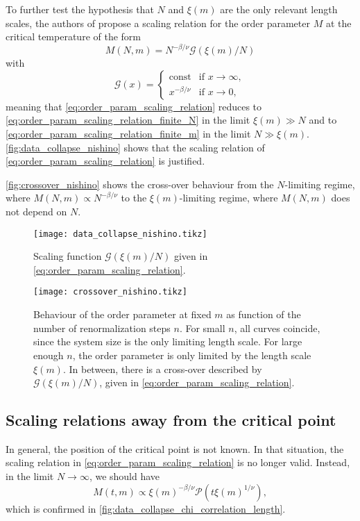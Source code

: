 To further test the hypothesis that $N$ and $\xi(m)$ are the only relevant length scales,
the authors of \cite{nishino1996numerical} propose a scaling relation for the order
parameter $M$ at the critical temperature of the form
\begin{equation}\label{eq:order_param_scaling_relation}
  M(N, m) = N^{-\beta/\nu} \mathcal{G}(\xi(m) / N)
\end{equation}
with
\begin{equation}
  \mathcal{G}(x) =
  \begin{cases}
    \text{const} & \text{if } x \to \infty, \\
    x^{-\beta/\nu} & \text{if } x \to 0,
  \end{cases}
\end{equation}
meaning that \autoref{eq:order_param_scaling_relation} reduces to
\autoref{eq:order_param_scaling_relation_finite_N} in the limit $\xi(m) \gg N$ and to
\autoref{eq:order_param_scaling_relation_finite_m} in the limit $N \gg \xi(m)$.
\autoref{fig:data_collapse_nishino} shows that the scaling relation of \autoref{eq:order_param_scaling_relation}
is justified.

\autoref{fig:crossover_nishino} shows the cross-over behaviour from the $N$-limiting regime, where
$M(N, m) \propto N^{-\beta/\nu}$ to the $\xi(m)$-limiting regime, where $M(N, m)$ does not depend on $N$.

\begin{figure}
  \texttt{[image: data\_collapse\_nishino.tikz]}
  \caption{Scaling function $\mathcal{G}(\xi(m)/N)$ given in
  \autoref{eq:order_param_scaling_relation}.}\label{fig:data_collapse_nishino}
\end{figure}

\begin{figure}
  \texttt{[image: crossover\_nishino.tikz]}
  \caption{Behaviour of the order parameter at fixed $m$ as function of
  the number of renormalization steps $n$. For small $n$, all curves coincide, since the system size is the only
  limiting length scale. For large enough $n$, the order parameter is only limited by the length scale
  $\xi(m)$. In between, there is a cross-over described by $\mathcal{G}(\xi(m)/N)$, given in
  \autoref{eq:order_param_scaling_relation}.}\label{fig:crossover_nishino}
\end{figure}

\subsection{Scaling relations away from the critical point}
In general, the position of the critical point is not known. In that situation, the scaling relation in
\autoref{eq:order_param_scaling_relation} is no longer valid. Instead, in the limit $N \to \infty$, we should have
\begin{equation}\label{eq:order_param_scaling_relation_finite_chi_t}
  M(t, m) \propto \xi(m)^{-\beta/\nu}\mathcal{P}(t \xi(m)^{1/\nu}),
\end{equation}
which is confirmed in \autoref{fig:data_collapse_chi_correlation_length}.

